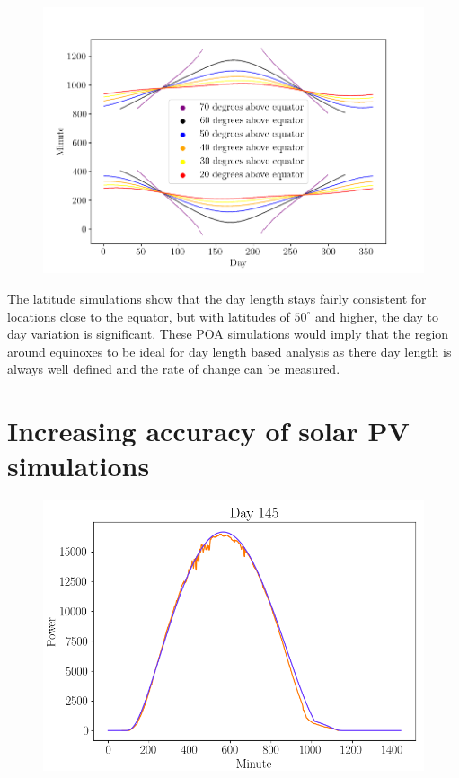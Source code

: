 \begin{figure}[ht!]
\centering
\includegraphics[width=1\linewidth]{pics/poa_var_lat}
\label{fig_poa_var_lat}
\end{figure}

\noindent The latitude simulations show that the day length stays fairly consistent for locations close to the equator, but with latitudes of $50^\circ$ and higher, the day to day variation is significant. These POA simulations would imply that the region around equinoxes to be ideal for day length based analysis as there day length is always well defined and the rate of change can be measured. 


\newpage

\section{Increasing accuracy of solar PV simulations}
\label{section_increased_accuracy_simulations}

\begin{figure}[h]
\centering
\includegraphics[width=0.7\linewidth]{pics/poa_eval_single_day}
\label{fig-poa_eval_single_day}
\end{figure}

